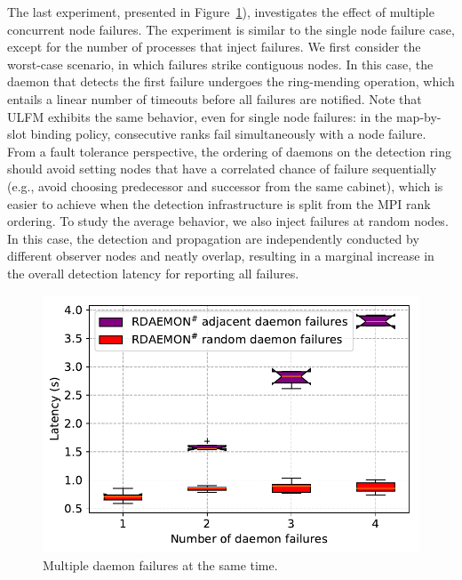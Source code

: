 \documentclass[5p,times,twocolumn]{elsarticle}
\newcommand{\ulfm}[0]{\textsc{ULFM}\xspace}
\newcommand{\mpi}[0]{\textsc{MPI}\xspace}
\begin{document}
The last experiment, presented in Figure~\ref{fig:multi.daemon.failure.nacl}), investigates the effect of multiple concurrent node failures. The experiment is similar to the single node failure case, except for the
number of processes that inject failures.
We first consider the worst-case scenario, in which failures strike
contiguous nodes. In this case, the daemon that detects the first failure
undergoes the ring-mending operation, which entails a linear number of timeouts
before all failures are notified. Note that \ulfm exhibits the same behavior, even
for single node failures: in the map-by-slot binding policy, consecutive ranks
fail simultaneously with a node failure. From a fault
tolerance perspective, the ordering of
daemons on the detection ring should avoid setting nodes that have a
correlated chance of failure sequentially (e.g., avoid choosing predecessor and successor from the same cabinet),
which is easier to achieve when the detection infrastructure is split from
the \mpi rank ordering.
To study the average behavior, we also inject failures at random nodes.
In this case, the detection and propagation are independently conducted by different observer nodes and neatly overlap, resulting in a marginal increase in the overall detection latency for
reporting all failures.

\begin{figure}[h]
  \centering
  \includegraphics[width=\linewidth]{multi_daemon_failures.pdf}
  \caption{Multiple daemon failures at the same time.}
  \label{fig:multi.daemon.failure.nacl}
\end{figure}
\end{document}

